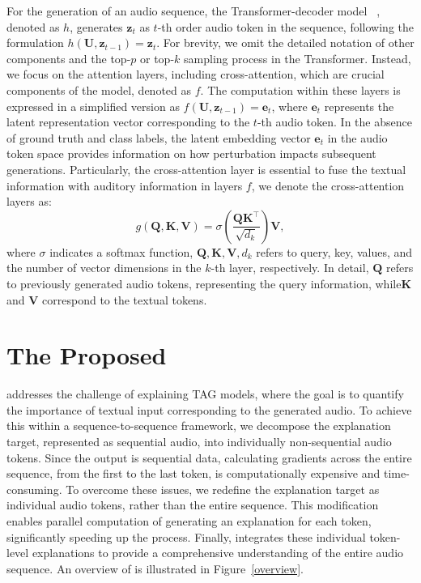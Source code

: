For the generation of an audio sequence, the Transformer-decoder model ~\cite{vaswani2017attention}, denoted as $h$, generates $\textbf{z}_{t}$ as $t$-th order audio token in the sequence, following the formulation $h(\textbf{U}, \textbf{z}_{t-1}) = \textbf{z}_{t}$. For brevity, we omit the detailed notation of other components and the top-$p$ or top-$k$ sampling process in the Transformer. Instead, we focus on the attention layers, including cross-attention, which are crucial components of the model, denoted as $f$. The computation within these layers is expressed in a simplified version as $f(\textbf{U}, \textbf{z}_{t-1}) = \textbf{e}_{t}$, where $\textbf{e}_{t}$ represents the latent representation vector corresponding to the $t$-th audio token. In the absence of ground truth and class labels, the latent embedding vector $\textbf{e}_{t}$ in the audio token space provides information on how perturbation impacts subsequent generations. Particularly, the cross-attention layer is essential to fuse the textual information with auditory information in layers $f$, we denote the cross-attention layers as:
\begin{equation}
\displaystyle g(\textbf{Q}, \textbf{K}, \textbf{V}) =  \sigma \left(\frac{\textbf{Q} \textbf{K}^\intercal}{\sqrt{d_k}}\right)\textbf{V},
\label{att}
\end{equation}
where $\sigma$ indicates a softmax function, $\textbf{Q}, \textbf{K}, \textbf{V}, d_k$ refers to query, key, values, and the number of vector dimensions in the $k$-th layer, respectively. In detail, $\textbf{Q}$ refers to previously generated audio tokens, representing the query information, while$\textbf{K}$ and $\textbf{V}$ correspond to the textual tokens.

\section{The Proposed \mname{}}
\mname{} addresses the challenge of explaining TAG models, where the goal is to quantify the importance of textual input corresponding to the generated audio. To achieve this within a sequence-to-sequence framework, we decompose the explanation target, represented as sequential audio, into individually non-sequential audio tokens. Since the output is sequential data, calculating gradients across the entire sequence, from the first to the last token, is computationally expensive and time-consuming. To overcome these issues, we redefine the explanation target as individual audio tokens, rather than the entire sequence. This modification enables parallel computation of generating an explanation for each token, significantly speeding up the process. Finally, \mname{} integrates these individual token-level explanations to provide a comprehensive understanding of the entire audio sequence. An overview of \mname{} is illustrated in Figure~\ref{overview}.

